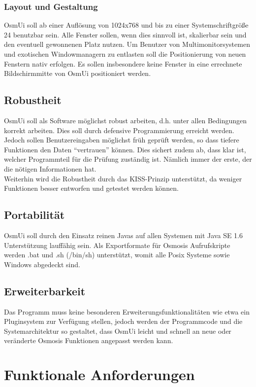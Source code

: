 \documentclass[a4paper,12pt]{scrartcl}
\begin{document}
\subsubsection{Layout und Gestaltung}
OsmUi soll ab einer Auflösung von 1024x768 und bis zu einer Systemschriftgröße 24 benutzbar sein. Alle Fenster sollen, wenn dies sinnvoll ist, skalierbar sein und den eventuell gewonnenen Platz
nutzen. Um Benutzer von Multimonitorsystemen und exotischen Windowmanagern zu entlasten soll die Positionierung von neuen Fenstern nativ erfolgen. Es
sollen insbesondere keine Fenster in eine errechnete Bildschirmmitte von OsmUi positioniert werden.
\subsection{Robustheit}
OsmUi soll als Software möglichst robust arbeiten, d.h. unter allen Bedingungen korrekt arbeiten. Dies soll durch defensive Programmierung erreicht werden.
Jedoch sollen Benutzereingaben möglichst früh geprüft werden, so dass tiefere Funktionen den Daten ``vertrauen'' können. Dies sichert zudem ab, dass klar ist, welcher
Programmteil für die Prüfung zuständig ist. Nämlich immer der erste, der die nötigen Informationen hat.\\
Weiterhin wird die Robustheit durch das KISS-Prinzip unterstützt, da weniger Funktionen besser entworfen und getestet werden können.
\subsection{Portabilität}
OsmUi soll durch den Einsatz reinen Javas auf allen Systemen mit Java SE 1.6 Unterstützung lauffähig sein. Als Exportformate für Osmosis Aufrufskripte
werden .bat und .sh (/bin/sh) unterstützt, womit alle Posix Systeme sowie Windows abgedeckt sind.
\subsection{Erweiterbarkeit}
Das Programm muss keine besonderen Erweiterungsfunktionalitäten wie etwa ein Pluginsystem zur Verfügung stellen, jedoch werden der Programmcode und die Systemarchitektur
so gestaltet, dass OsmUi leicht und schnell an neue oder veränderte Osmosis Funktionen angepasst werden kann.



\section{Funktionale Anforderungen}
\end{document}
